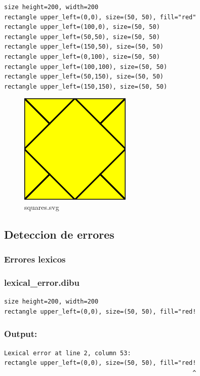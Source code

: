 \documentclass{article}
\theoremstyle{definition}
\theoremstyle{remark}
\begin{document}
\begin{verbatim}
size height=200, width=200
rectangle upper_left=(0,0), size=(50, 50), fill="red"
rectangle upper_left=(100,0), size=(50, 50)
rectangle upper_left=(50,50), size=(50, 50)
rectangle upper_left=(150,50), size=(50, 50)
rectangle upper_left=(0,100), size=(50, 50)
rectangle upper_left=(100,100), size=(50, 50)
rectangle upper_left=(50,150), size=(50, 50)
rectangle upper_left=(150,150), size=(50, 50)
\end{verbatim}

\begin{figure}[H]
  \centering
  \includegraphics[scale=0.6]{images/squares}
  \caption{squares.svg}
\end{figure}

\subsection{Deteccion de errores}

\subsubsection{Errores lexicos}

\subsubsection*{lexical\_error.dibu}
\begin{verbatim}
size height=200, width=200
rectangle upper_left=(0,0), size=(50, 50), fill="red!
\end{verbatim}

\subsubsection*{Output:}
\begin{verbatim}
Lexical error at line 2, column 53:
rectangle upper_left=(0,0), size=(50, 50), fill="red!
                                                    ^
\end{verbatim}
                 
\end{document}
